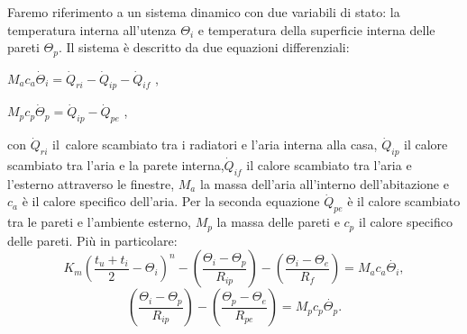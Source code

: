 \documentclass[laurea,oneside,11pt]{USiena_tesiLM3}
\begin{document}
Faremo riferimento a un sistema dinamico con due variabili di stato: la temperatura interna all'utenza  $\Theta_i$  e  temperatura della superficie interna delle pareti  $\Theta_p$. Il sistema è  descritto  da due equazioni differenziali:
\begin{center}
$M_ac_a \dot{\Theta}_i = \dot{Q}_{ri} - \dot{Q}_{ip} - \dot{Q}_{if}$ ,
\end{center}
\begin{center}
$M_pc_p \dot{\Theta}_p = \dot{Q}_{ip} - \dot{Q}_{pe}$ ,
\end{center}
con $\dot{Q}_{ri}$ il\ calore scambiato tra i radiatori e l'aria interna alla casa, $\dot{Q}_{ip}$ il calore scambiato tra l'aria e la parete interna,$\dot{Q}_{if}$ il calore scambiato tra l'aria e l'esterno attraverso le finestre, $M_a$ la massa dell'aria all'interno dell'abitazione e $c_a$ è il calore specifico dell'aria. Per la seconda equazione $ \dot{Q}_{pe}$ è il calore scambiato tra le pareti e l'ambiente esterno, $M_p$ la massa delle pareti e $c_p$ il calore specifico delle pareti.
Più in particolare:
\begin{equation}
K_m\left(\frac{t_u + t_i}{2} - \Theta_{i}\right)^n - \left(\frac{\Theta_{i} - \Theta_p}{R_{ip}}\right) - \left(\frac{\Theta_{i} - \Theta_e}{R_{f}}\right) = M_ac_a \dot{\Theta_i} ,
\end{equation}
\begin{equation}
\left(\frac{\Theta_{i} - \Theta_p}{R_{ip}}\right) - \left(\frac{\Theta_{p} - \Theta_e}{R_{pe}}\right) = M_pc_p \dot{\Theta_p} .
\end{equation}
\end{document}
